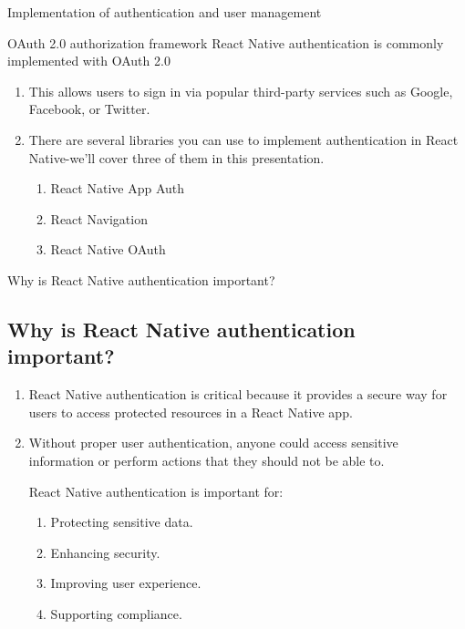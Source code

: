 \documentclass[10pt]{beamer}
\begin{document}
\begin{frame}{Implementation of authentication and user management}
\begin{block}{OAuth 2.0 authorization framework}
React Native authentication is commonly implemented with OAuth 2.0
\begin{enumerate}
\item[\ding{230}]This allows users to sign in via popular third-party services such as Google, Facebook, or Twitter.
\item[\ding{230}]There are several libraries you can use to implement authentication in React Native-we'll cover three of them in this presentation.
\begin{enumerate}
\item React Native App Auth
\item React Navigation
\item React Native OAuth
\end{enumerate}
\end{enumerate}

\end{block}

\end{frame}

\begin{frame}{Why is React Native authentication important?}
\subsection{Why is React Native authentication important?}
\begin{enumerate}
\item[\ding{230}]React Native authentication is critical because it provides a secure way for users to access protected resources in a React Native app.
\item[\ding{230}]Without proper user authentication, anyone could access sensitive information or perform actions that they should not be able to. 
\begin{block}{React Native authentication is important for:}
\begin{enumerate}
\item[\ding{242}]Protecting sensitive data.
\item[\ding{242}]Enhancing security.
\item[\ding{242}]Improving user experience.
\item[\ding{242}]Supporting compliance.
\end{enumerate}
\end{block}
\end{enumerate}
\end{frame}
\end{document}
